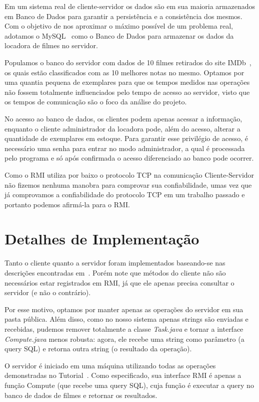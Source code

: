 \documentclass[12pt,a4paper]{article}
\begin{document}
Em um sistema real de cliente-servidor os dados são em sua maioria armazenados em Banco de Dados para garantir a persistência e a consistência dos mesmos. Com o objetivo de nos aproximar o máximo possível de um problema real, adotamos o MySQL~\cite{mysql1995mysql} como o Banco de Dados para armazenar os dados da locadora de filmes no servidor.

    Populamos o banco do servidor com dados de 10 filmes retirados do site IMDb~\cite{IMDbsite}, os quais estão classificados com as 10 melhores notas no mesmo. Optamos por uma quantia pequena de exemplares para que os tempos medidos nas operações não fossem totalmente influenciados pelo tempo de acesso ao servidor, visto que os tempos de comunicação são o foco da análise do projeto.
    
    No acesso ao banco de dados, os clientes podem apenas acessar a informação, enquanto o cliente administrador da locadora pode, além do acesso, alterar a quantidade de exemplares em estoque. Para garantir esse privilégio de acesso, é necessário uma senha para entrar no modo administrador, a qual é processada pelo programa e só após confirmada o acesso diferenciado ao banco pode ocorrer.
    
Como o RMI utiliza por baixo o protocolo TCP na comunicação Cliente-Servidor não fizemos nenhuma manobra para comprovar sua confiabilidade, umas vez que já comprovamos a confiabilidade do protocolo TCP em um trabalho passado e portanto podemos afirmá-la para o RMI.

\section{Detalhes de Implementação}

Tanto o cliente quanto a servidor foram implementados baseando-se nas descrições encontradas em~\cite{RMITutorial}. Porém note que métodos do cliente não são necessários estar registrados em RMI, já que ele apenas precisa consultar o servidor (e não o contrário).

Por esse motivo, optamos por manter apenas as operações do servidor em sua pasta pública. Além disso, como no nosso sistema apenas strings são enviadas e recebidas, pudemos remover totalmente a classe {\it Task.java} e tornar a interface {\it Compute.java} menos robusta: agora, ele recebe uma string como parâmetro (a query SQL) e retorna outra string (o resultado da operação).

O servidor é iniciado em uma máquina utilizando todas as operações demonstradas no Tutorial~\cite{RMITutorial}. Como especificado, sua interface RMI é apenas a função Compute (que recebe uma query SQL), cuja função é executar a query no banco de dados de filmes e retornar os resultados.
\end{document}
